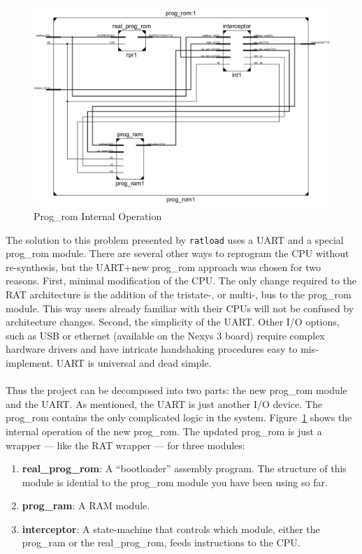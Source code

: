 \documentclass[notitlepage]{article}
\begin{document}
\begin{figure}[ht!]
  \centering
  \includegraphics[width=1\textwidth]{prog_rom_internal.png}
  \caption{Prog\_rom Internal Operation}
  \label{fig:prog_rom_internal}
\end{figure}

The solution to this problem presented by \texttt{ratload} uses a UART and a special prog\_rom module. There are several other ways to reprogram the CPU without re-synthesis, but the UART+new prog\_rom approach was chosen for two reasons. First, minimal modification of the CPU. The only change required to the RAT architecture is the addition of the tristate-, or multi-, bus to the prog\_rom module. This way users already familiar with their CPUs will not be confused by architecture changes. Second, the simplicity of the UART. Other I/O options, such as USB or ethernet (available on the Nexys 3 board) require complex hardware drivers and have intricate handshaking procedures easy to mis-implement. UART is universal and dead simple.\\\\
Thus the project can be decomposed into two parts: the new prog\_rom module and the UART. As mentioned, the UART is just another I/O device. The prog\_rom contains the only complicated logic in the system. Figure~\ref{fig:prog_rom_internal} shows the internal operation of the new prog\_rom. The updated prog\_rom is just a wrapper --- like the RAT wrapper --- for three modules:

\begin{enumerate}
\item \textbf{real\_prog\_rom}: A ``bootloader'' assembly program. The structure of this module is idential to the prog\_rom module you have been using so far.
\item \textbf{prog\_ram}: A RAM module.
\item \textbf{interceptor}: A state-machine that controls which module, either the prog\_ram or the real\_prog\_rom, feeds instructions to the CPU.
\end{enumerate}
\end{document}
